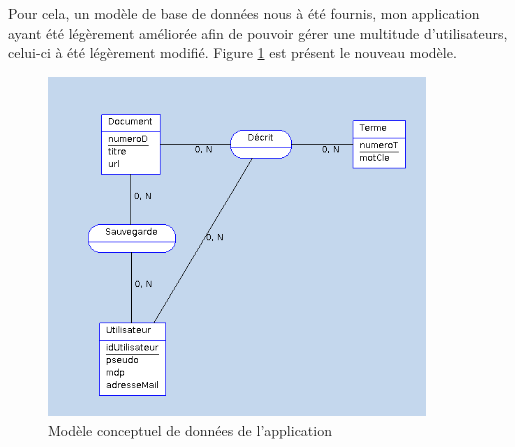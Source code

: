 \documentclass[12pt,a4paper,openany]{book}
\begin{document}
	Pour cela, un modèle de base de données nous à été fournis, mon application ayant été légèrement améliorée afin de pouvoir gérer
	une multitude d'utilisateurs, celui-ci à été légèrement modifié. Figure \ref{fig:redmine} est présent le nouveau modèle. 
	\begin{figure}[H]
		\centering
		\includegraphics[width=10cm]{screens/mcd.png} 
		\caption{Modèle conceptuel de données de l'application}
		\label{fig:redmine}
	\end{figure}
\end{document}
